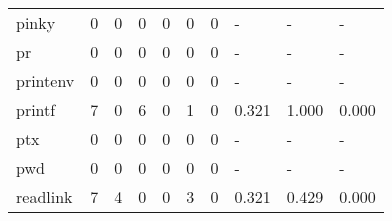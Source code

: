 \begin{longtable}{lp{2.0cm}p{2.0cm}p{2.0cm}p{2.0cm}p{2.0cm}p{2.0cm}p{2.0cm}p{2.0cm}p{2.0cm}}
pinky     &                      0 &                                  0 &                                 0 &                                0 &                                 0 &                               0 &                                    - &                                      - &                                    - \\
pr        &                      0 &                                  0 &                                 0 &                                0 &                                 0 &                               0 &                                    - &                                      - &                                    - \\
printenv  &                      0 &                                  0 &                                 0 &                                0 &                                 0 &                               0 &                                    - &                                      - &                                    - \\
printf    &                      7 &                                  0 &                                 6 &                                0 &                                 1 &                               0 &                                0.321 &                                  1.000 &                                0.000 \\
ptx       &                      0 &                                  0 &                                 0 &                                0 &                                 0 &                               0 &                                    - &                                      - &                                    - \\
pwd       &                      0 &                                  0 &                                 0 &                                0 &                                 0 &                               0 &                                    - &                                      - &                                    - \\
readlink  &                      7 &                                  4 &                                 0 &                                0 &                                 3 &                               0 &                                0.321 &                                  0.429 &                                0.000 \\

\end{longtable}
